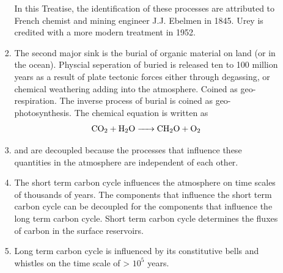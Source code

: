 \documentclass[final,10pt,reqno,twoside]{article}
\begin{document}
\begin{enumerate}[leftmargin=0cm, align=left]
\begin{enumerate}[label=\textbf{(\alph*})]
\begin{enumerate}
         		   In this Treatise, the identification of these processes are attributed to French chemist and mining engineer J.J. Ebelmen in 1845. Urey is credited with a more modern treatment in 1952.
         		\item The second major  sink is the burial of organic material on land (or in the ocean). Physcial seperation of buried  is released ten to 100 million years as a result of plate tectonic forces either through degassing, or chemical weathering adding  into the atmosphere. Coined as geo-respiration. The inverse process of burial is coined as geo-photosynthesis. The chemical equation is written as
         		    \begin{equation}
         		    	\ce{CO2 + H2O -> CH2O + O2}
         		    \end{equation}
         		\item {} and  are decoupled because the processes that influence these quantities in the atmosphere are independent of each other.
         		\item The short term carbon cycle influences the atmosphere on time scales of thousands of years. The components that influence the short term carbon cycle can be decoupled for the components that influence the long term carbon cycle. Short term carbon cycle determines the fluxes of carbon in the surface reservoirs.  
         		\item Long term carbon cycle is influenced by its constitutive bells and whistles on the time scale of > $10^5$ years.   
         	\end{enumerate}
         \end{enumerate}     
 \end{enumerate}

  
%  
%  
\end{document}
